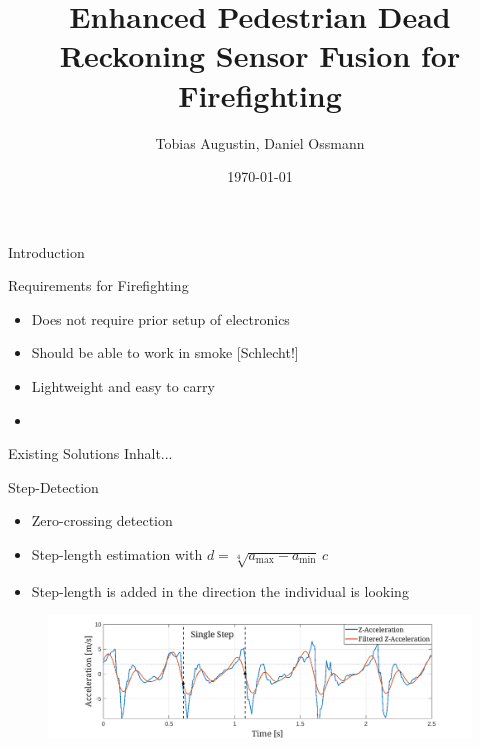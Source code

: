 \documentclass[aspectratio=1609]{beamer}
\title[Enhanced PDR for Firefighting]{Enhanced Pedestrian Dead Reckoning Sensor Fusion for Firefighting}
\author{Tobias Augustin, Daniel Ossmann}
\institute[]{University of Applied Science Munich, HM}
\date{\today}
\begin{document}
	
	{
	{
	
		\begin{frame}
			\titlepage
		\end{frame}}
	\usebackgroundtemplate{ }
	
	\begin{frame}{Introduction}
		
	\end{frame}}
	
	\begin{frame}{Requirements for Firefighting}
		\begin{itemize}
			\item Does not require prior setup of electronics
			\item Should be able to work in smoke [Schlecht!]
			\item Lightweight and easy to carry
			\item 
		\end{itemize}
	\end{frame}
	
	\begin{frame}{Existing Solutions}
		Inhalt...
	\end{frame}
	
	\begin{frame}{Step-Detection}
		\begin{itemize}
			\item Zero-crossing detection 
			\item Step-length estimation with $d = \sqrt[4]{a_{\max}-a_{\min}}  \, c$
			\item Step-length is added in the direction the individual is looking
		\end{itemize}
		\vspace{0.5cm}
		\begin{figure}
			\centering
			\includegraphics[width=0.9\linewidth]{../Conference_Paper/WalkAcceleration}
			\caption{}
			\label{fig:walkacceleration}
		\end{figure}
			

		
	\end{frame}
	
\end{document}
